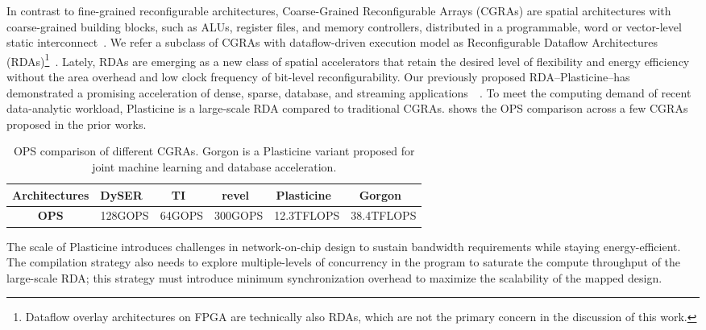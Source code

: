 In contrast to fine-grained reconfigurable architectures,
Coarse-Grained Reconfigurable Arrays (CGRAs) are spatial architectures with 
coarse-grained building blocks, such as ALUs, register files, and memory controllers, 
distributed in a programmable, word or vector-level static interconnect~\cite{adres, kress, dyser, piperench, tartan, 
hrl, hycube}.
We refer a subclass of CGRAs with dataflow-driven execution model as Reconfigurable Dataflow
Architectures (RDAs)\footnote{Dataflow overlay architectures on FPGA are technically also RDAs, which are not the primary concern in the discussion of this work.}~\cite{plasticine, ti, streamdataflow,neuflow,cnndataflow,dataflowarch}.
Lately, RDAs are emerging as a new class of spatial accelerators that retain the desired level of
flexibility and energy efficiency without the area overhead and low clock frequency of bit-level reconfigurability.
Our previously proposed RDA--Plasticine--has demonstrated a promising acceleration of dense, sparse, database, and streaming applications~~\cite{plasticine, gorgon, multijoin,prabhakarthesis}.
To meet the computing demand of recent data-analytic workload, Plasticine is a large-scale RDA
compared to traditional CGRAs. 
 shows the OPS comparison across a few CGRAs proposed in the prior works.

\begin{table}
  \centering
\begin{tabular*}{0.88\textwidth}{cccccc}
  \toprule
  \textbf{Architectures} & DySER~\cite{dyser} & TI~\cite{ti} & revel~\cite{revel}
  & Plasticine~\cite{plasticine} & Gorgon~\cite{gorgon}\\\midrule
  \textbf{OPS} & 128GOPS & 64GOPS & 300GOPS & 12.3TFLOPS & 38.4TFLOPS \\
  \bottomrule
\end{tabular*}
\caption[OPS comparison of different CGRAs]{OPS comparison of different CGRAs. Gorgon is a
Plasticine variant proposed for joint machine learning and database acceleration.}
\label{tab:ops}
\end{table}

The scale of Plasticine introduces challenges in network-on-chip design to sustain 
bandwidth requirements while staying energy-efficient.
The compilation strategy also needs to explore multiple-levels of
concurrency in the program to saturate the compute throughput of the large-scale RDA;
this strategy must introduce minimum synchronization overhead to maximize the scalability of the mapped design.

